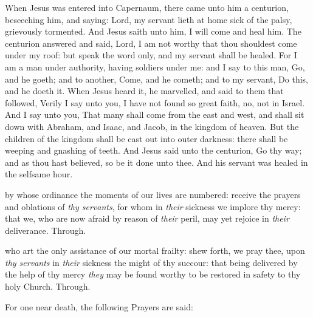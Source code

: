 
 When Jesus was entered into Capernaum, there came unto him a centurion, beseeching him, and saying: Lord, my servant lieth at home sick of the palsy, grievously tormented. And Jesus saith unto him, I will come and heal him. The centurion answered and said, Lord, I am not worthy that thou shouldest come under my roof: but speak the word only, and my servant shall be healed. For I am a man under authority, having soldiers under me: and I say to this man, Go, and he goeth; and to another, Come, and he cometh; and to my servant, Do this, and he doeth it. When Jesus heard it, he marvelled, and said to them that followed, Verily I say unto you, I have not found so great faith, no, not in Israel. And I say unto you, That many shall come from the east and west, and shall sit down with Abraham, and Isaac, and Jacob, in the kingdom of heaven. But the children of the kingdom shall be cast out into outer darkness: there shall be weeping and gnashing of teeth. And Jesus said unto the centurion, Go thy way; and as thou hast believed, so be it done unto thee. And his servant was healed in the selfsame hour.


\secret
{} by whose ordinance the moments of our lives are numbered: receive the prayers and oblations of \emph{thy servants}, for whom in \emph{their} sickness we implore thy mercy: that we, who are now afraid by reason of \emph{their} peril, may yet rejoice in \emph{their} deliverance. Through. 


\postcommunion
{} who art the only assistance of our mortal frailty: shew forth, we pray thee, upon \emph{thy servants} in \emph{their} sickness the might of thy succour: that being delivered by the help of thy mercy \emph{they} may be found worthy to be restored in safety to thy holy Church. Through.

\begin{rubric}
	For one near death, the following Prayers are said:
\end{rubric}

